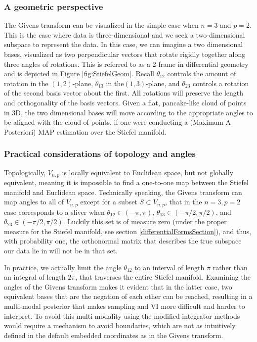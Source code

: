 \documentclass{article}
\begin{document}
\subsubsection{A geometric perspective}
The Givens transform can be visualized in the simple case when $n = 3$ and $p = 2$. This is the case where data is three-dimensional and we seek a two-dimensional subspace to represent the data. In this case, we can imagine a two dimensional bases, visualized as two perpendicular vectors that rotate rigidly together along three angles of rotations. This is referred to as a 2-frame in differential geometry \citep{muirhead2009aspects} and is depicted in Figure \ref{fig:StiefelGeom}. Recall $\theta_{12}$ controls the amount of rotation in the $(1,2)$-plane, $\theta_{13}$ in the$(1,3)$-plane, and $\theta_{23}$ controls a rotation of the second basis vector about the first. All rotations will preserve the length and orthogonality of the basis vectors. Given a flat, pancake-like cloud of points in 3D, the two dimensional bases will move according to the appropriate angles to be aligned with the cloud of points, if one were conducting a (Maximum A-Posteriori) MAP estimation over the Stiefel manifold.

\subsubsection{Practical considerations of topology and angles}
Topologically, $V_{n,p}$ is locally equivalent to Euclidean space, but not globally equivalent, meaning it is impossible to find a one-to-one map between the Stiefel manifold and Euclidean space. Technically speaking, the Givens transform can map angles to all of $V_{n,p}$ except for a subset $S \subset V_{n,p}$, that in the $n=3, p=2$ case corresponds to a sliver when $\theta_{12} \in (-\pi, \pi)$, $\theta_{13} \in (-\pi/2, \pi/2)$, and $\theta_{23} \in (-\pi/2, \pi/2)$. Luckily this set is of measure zero (under the proper measure for the Stiefel manifold, see section \ref{differentialFormsSection}), and thus, with probability one, the orthonormal matrix that describes the true subspace our data lie in will not be in that set. 

In practice, we actually limit the angle $\theta_{12}$ to an interval of length $\pi$ rather than an integral of length $2\pi$, that traverses the entire Stiefel manifold. Examining the angles of the Givens transform makes it evident that in the latter case, two equivalent bases that are the negation of each other can be reached, resulting in a multi-modal posterior that makes sampling and VI more difficult and harder to interpret. To avoid this multi-modality using the modified integrator methods would require a mechanism to avoid boundaries, which are not as intuitively defined in the default embedded coordinates as in the Givens transform.
\end{document}
